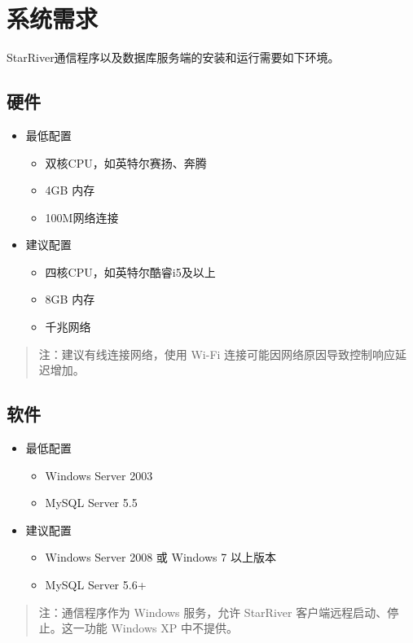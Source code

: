 \section{系统需求}\label{ux7cfbux7edfux9700ux6c42}

StarRiver通信程序以及数据库服务端的安装和运行需要如下环境。

\subsection{硬件}\label{ux786cux4ef6}

\begin{itemize}
\itemsep1pt\parskip0pt
\item
  最低配置

  \begin{itemize}
  \itemsep1pt\parskip0pt
  \item
    双核CPU，如英特尔赛扬、奔腾
  \item
    4GB 内存
  \item
    100M网络连接
  \end{itemize}
\item
  建议配置

  \begin{itemize}
  \itemsep1pt\parskip0pt
  \item
    四核CPU，如英特尔酷睿i5及以上
  \item
    8GB 内存
  \item
    千兆网络
  \end{itemize}
\end{itemize}

\begin{quote}
注：建议有线连接网络，使用 Wi-Fi
连接可能因网络原因导致控制响应延迟增加。
\end{quote}

\subsection{软件}\label{ux8f6fux4ef6}

\begin{itemize}
\itemsep1pt\parskip0pt
\item
  最低配置

  \begin{itemize}
  \itemsep1pt\parskip0pt
  \item
    Windows Server 2003
  \item
    MySQL Server 5.5
  \end{itemize}
\item
  建议配置

  \begin{itemize}
  \itemsep1pt\parskip0pt
  \item
    Windows Server 2008 或 Windows 7 以上版本
  \item
    MySQL Server 5.6+
  \end{itemize}
\end{itemize}

\begin{quote}
注：通信程序作为 Windows 服务，允许 StarRiver
客户端远程启动、停止。这一功能 Windows XP 中不提供。
\end{quote}

